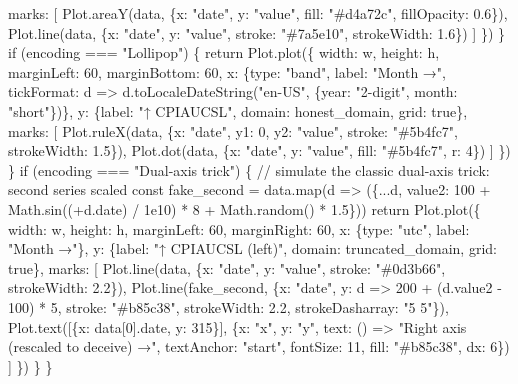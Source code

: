 \documentclass[
  letterpaper,
  11pt,
  twoside,
  openany]{scrbook}
\newenvironment{Shaded}{\begin{snugshade}}{\end{snugshade}}
\newcommand{\NormalTok}[1]{\textcolor[rgb]{0.33,0.33,0.33}{#1}}
\begin{document}
\begin{Shaded}
\begin{Highlighting}[]
\NormalTok{      marks: [}
\NormalTok{        Plot.areaY(data, \{x: "date", y: "value", fill: "\#d4a72c", fillOpacity: 0.6\}),}
\NormalTok{        Plot.line(data, \{x: "date", y: "value", stroke: "\#7a5e10", strokeWidth: 1.6\})}
\NormalTok{      ]}
\NormalTok{    \})}
\NormalTok{  \}}
\NormalTok{  if (encoding === "Lollipop") \{}
\NormalTok{    return Plot.plot(\{}
\NormalTok{      width: w, height: h, marginLeft: 60, marginBottom: 60,}
\NormalTok{      x: \{type: "band", label: "Month →", tickFormat: d =\textgreater{} d.toLocaleDateString("en{-}US", \{year: "2{-}digit", month: "short"\})\},}
\NormalTok{      y: \{label: "↑ CPIAUCSL", domain: honest\_domain, grid: true\},}
\NormalTok{      marks: [}
\NormalTok{        Plot.ruleX(data, \{x: "date", y1: 0, y2: "value", stroke: "\#5b4fc7", strokeWidth: 1.5\}),}
\NormalTok{        Plot.dot(data, \{x: "date", y: "value", fill: "\#5b4fc7", r: 4\})}
\NormalTok{      ]}
\NormalTok{    \})}
\NormalTok{  \}}
\NormalTok{  if (encoding === "Dual{-}axis trick") \{}
\NormalTok{    // simulate the classic dual{-}axis trick: second series scaled}
\NormalTok{    const fake\_second = data.map(d =\textgreater{} (\{...d, value2: 100 + Math.sin((+d.date) / 1e10) * 8 + Math.random() * 1.5\}))}
\NormalTok{    return Plot.plot(\{}
\NormalTok{      width: w, height: h, marginLeft: 60, marginRight: 60,}
\NormalTok{      x: \{type: "utc", label: "Month →"\},}
\NormalTok{      y: \{label: "↑ CPIAUCSL (left)", domain: truncated\_domain, grid: true\},}
\NormalTok{      marks: [}
\NormalTok{        Plot.line(data, \{x: "date", y: "value", stroke: "\#0d3b66", strokeWidth: 2.2\}),}
\NormalTok{        Plot.line(fake\_second, \{x: "date", y: d =\textgreater{} 200 + (d.value2 {-} 100) * 5, stroke: "\#b85c38", strokeWidth: 2.2, strokeDasharray: "5 5"\}),}
\NormalTok{        Plot.text([\{x: data[0].date, y: 315\}], \{x: "x", y: "y", text: () =\textgreater{} "Right axis (rescaled to deceive) →", textAnchor: "start", fontSize: 11, fill: "\#b85c38", dx: 6\})}
\NormalTok{      ]}
\NormalTok{    \})}
\NormalTok{  \}}
\NormalTok{\}}
\end{Highlighting}
\end{Shaded}
\end{document}
